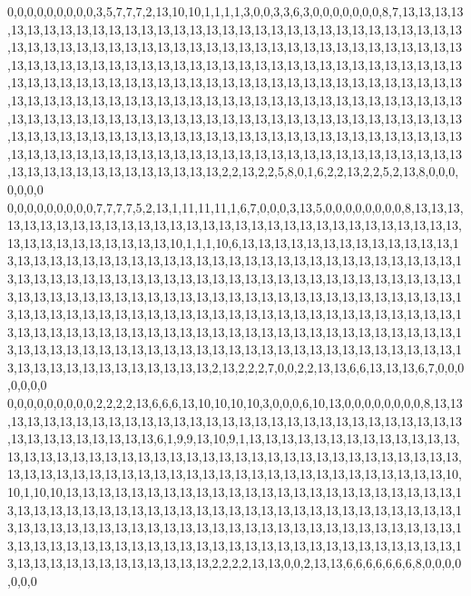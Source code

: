 0,0,0,0,0,0,0,0,0,3,5,7,7,7,2,13,10,10,1,1,1,1,3,0,0,3,3,6,3,0,0,0,0,0,0,0,8,7,13,13,13,13,13,13,13,13,13,13,13,13,13,13,13,13,13,13,13,13,13,13,13,13,13,13,13,13,13,13,13,13,13,13,13,13,13,13,13,13,13,13,13,13,13,13,13,13,13,13,13,13,13,13,13,13,13,13,13,13,13,13,13,13,13,13,13,13,13,13,13,13,13,13,13,13,13,13,13,13,13,13,13,13,13,13,13,13,13,13,13,13,13,13,13,13,13,13,13,13,13,13,13,13,13,13,13,13,13,13,13,13,13,13,13,13,13,13,13,13,13,13,13,13,13,13,13,13,13,13,13,13,13,13,13,13,13,13,13,13,13,13,13,13,13,13,13,13,13,13,13,13,13,13,13,13,13,13,13,13,13,13,13,13,13,13,13,13,13,13,13,13,13,13,13,13,13,13,13,13,13,13,13,13,13,13,13,13,13,13,13,13,13,13,13,13,13,13,13,13,13,13,13,13,13,13,13,13,13,13,13,13,13,13,13,13,13,13,13,13,13,13,13,13,13,13,13,13,13,13,13,13,13,13,13,13,13,13,13,13,13,2,2,13,2,2,5,8,0,1,6,2,2,13,2,2,5,2,13,8,0,0,0,0,0,0,0
0,0,0,0,0,0,0,0,0,7,7,7,7,5,2,13,1,11,11,11,1,6,7,0,0,0,3,13,5,0,0,0,0,0,0,0,0,8,13,13,13,13,13,13,13,13,13,13,13,13,13,13,13,13,13,13,13,13,13,13,13,13,13,13,13,13,13,13,13,13,13,13,13,13,13,13,13,13,13,10,1,1,1,10,6,13,13,13,13,13,13,13,13,13,13,13,13,13,13,13,13,13,13,13,13,13,13,13,13,13,13,13,13,13,13,13,13,13,13,13,13,13,13,13,13,13,13,13,13,13,13,13,13,13,13,13,13,13,13,13,13,13,13,13,13,13,13,13,13,13,13,13,13,13,13,13,13,13,13,13,13,13,13,13,13,13,13,13,13,13,13,13,13,13,13,13,13,13,13,13,13,13,13,13,13,13,13,13,13,13,13,13,13,13,13,13,13,13,13,13,13,13,13,13,13,13,13,13,13,13,13,13,13,13,13,13,13,13,13,13,13,13,13,13,13,13,13,13,13,13,13,13,13,13,13,13,13,13,13,13,13,13,13,13,13,13,13,13,13,13,13,13,13,13,13,13,13,13,13,13,13,13,13,13,13,13,13,13,13,13,13,13,13,13,13,13,13,13,13,2,13,2,2,2,7,0,0,2,2,13,13,6,6,13,13,13,6,7,0,0,0,0,0,0,0
0,0,0,0,0,0,0,0,0,2,2,2,2,13,6,6,6,13,10,10,10,10,3,0,0,0,6,10,13,0,0,0,0,0,0,0,0,8,13,13,13,13,13,13,13,13,13,13,13,13,13,13,13,13,13,13,13,13,13,13,13,13,13,13,13,13,13,13,13,13,13,13,13,13,13,13,13,6,1,9,9,13,10,9,1,13,13,13,13,13,13,13,13,13,13,13,13,13,13,13,13,13,13,13,13,13,13,13,13,13,13,13,13,13,13,13,13,13,13,13,13,13,13,13,13,13,13,13,13,13,13,13,13,13,13,13,13,13,13,13,13,13,13,13,13,13,13,13,13,13,13,13,13,10,10,1,10,10,13,13,13,13,13,13,13,13,13,13,13,13,13,13,13,13,13,13,13,13,13,13,13,13,13,13,13,13,13,13,13,13,13,13,13,13,13,13,13,13,13,13,13,13,13,13,13,13,13,13,13,13,13,13,13,13,13,13,13,13,13,13,13,13,13,13,13,13,13,13,13,13,13,13,13,13,13,13,13,13,13,13,13,13,13,13,13,13,13,13,13,13,13,13,13,13,13,13,13,13,13,13,13,13,13,13,13,13,13,13,13,13,13,13,13,13,13,13,13,13,13,2,2,2,2,13,13,0,0,2,13,13,6,6,6,6,6,6,6,8,0,0,0,0,0,0,0
